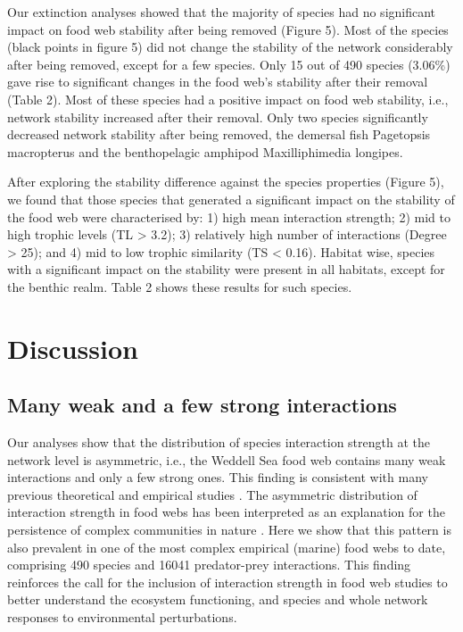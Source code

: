 \documentclass[gc, manuscript]{copernicus}
\begin{document}
Our extinction analyses showed that the majority of species had no
significant impact on food web stability after being removed (Figure 5).
Most of the species (black points in figure 5) did not change the
stability of the network considerably after being removed, except for a
few species. Only 15 out of 490 species (3.06\%) gave rise to
significant changes in the food web's stability after their removal
(Table 2). Most of these species had a positive impact on food web
stability, i.e., network stability increased after their removal. Only
two species significantly decreased network stability after being
removed, the demersal fish Pagetopsis macropterus and the benthopelagic
amphipod Maxilliphimedia longipes.

After exploring the stability difference against the species properties
(Figure 5), we found that those species that generated a significant
impact on the stability of the food web were characterised by: 1) high
mean interaction strength; 2) mid to high trophic levels (TL
\textgreater{} 3.2); 3) relatively high number of interactions (Degree
\textgreater{} 25); and 4) mid to low trophic similarity (TS \textless{}
0.16). Habitat wise, species with a significant impact on the stability
were present in all habitats, except for the benthic realm. Table 2
shows these results for such species.

\section{Discussion}

\subsection{Many weak and a few strong interactions}

Our analyses show that the distribution of species interaction strength
at the network level is asymmetric, i.e., the Weddell Sea food web
contains many weak interactions and only a few strong ones. This finding
is consistent with many previous theoretical and empirical studies
\citep[e.g.][]{McCann1998, Neutel2002, Emmerson2004, Wootton2005, Kortsch2021}.
The asymmetric distribution of interaction strength in food webs has
been interpreted as an explanation for the persistence of complex
communities in nature \citep{Bascompte2005, Allesina2015, Nilsson2016}.
Here we show that this pattern is also prevalent in one of the most
complex empirical (marine) food webs to date, comprising 490 species and
16041 predator-prey interactions. This finding reinforces the call for
the inclusion of interaction strength in food web studies to better
understand the ecosystem functioning, and species and whole network
responses to environmental perturbations.
\end{document}
